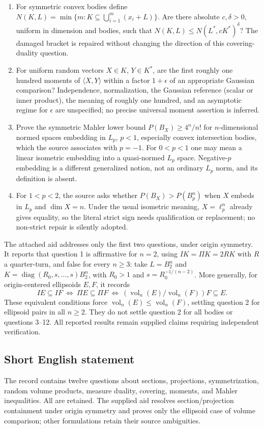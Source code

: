 \documentclass[11pt]{article}
\begin{document}
\begin{enumerate}
\item For symmetric convex bodies define $N(K,L)=\min\{m:K\subseteq\bigcup_{i=1}^m(x_i+L)\}$. Are there absolute $c,\delta>0$, uniform in dimension and bodies, such that $N(K,L)\leq N(L^*,cK^*)^\delta$? The damaged bracket is repaired without changing the direction of this covering-duality question.
\item For uniform random vectors $X\in K$, $Y\in K^*$, are the first roughly one hundred moments of $\langle X,Y\rangle$ within a factor $1+\epsilon$ of an appropriate Gaussian comparison? Independence, normalization, the Gaussian reference (scalar or inner product), the meaning of roughly one hundred, and an asymptotic regime for $\epsilon$ are unspecified; no precise universal moment assertion is inferred.
\item Prove the symmetric Mahler lower bound $P(B_X)\geq4^n/n!$ for $n$-dimensional normed spaces embedding in $L_p$, $p<1$, especially convex intersection bodies, which the source associates with $p=-1$. For $0<p<1$ one may mean a linear isometric embedding into a quasi-normed $L_p$ space. Negative-$p$ embedding is a different generalized notion, not an ordinary $L_p$ norm, and its definition is absent.
\item For $1<p<2$, the source asks whether $P(B_X)>P(B_p^n)$ when $X$ embeds in $L_p$ and $\dim X=n$. Under the usual isometric meaning, $X=\ell_p^n$ already gives equality, so the literal strict sign needs qualification or replacement; no non-strict repair is silently adopted.
\end{enumerate}

The attached aid addresses only the first two questions, under origin symmetry. It reports that question 1 is affirmative for $n=2$, using $IK=\Pi K=2RK$ with $R$ a quarter-turn, and false for every $n\geq3$: take $L=B_2^n$ and $K=\operatorname{diag}(R_0,s,\ldots,s)B_2^n$, with $R_0>1$ and $s=R_0^{-1/(n-2)}$. More generally, for origin-centered ellipsoids $E,F$, it records
\[
 IE\subseteq IF\ \Longleftrightarrow\ \Pi E\subseteq\Pi F
 \ \Longleftrightarrow\ (\operatorname{vol}_n(E)/\operatorname{vol}_n(F))F\subseteq E.
\]
These equivalent conditions force $\operatorname{vol}_n(E)\leq\operatorname{vol}_n(F)$, settling question 2 for ellipsoid pairs in all $n\geq2$. They do not settle question 2 for all bodies or questions 3--12. All reported results remain supplied claims requiring independent verification.
\subsection{Short English statement}
The record contains twelve questions about sections, projections, symmetrization, random volume products, measure duality, covering, moments, and Mahler inequalities. All are retained. The supplied aid resolves section/projection containment under origin symmetry and proves only the ellipsoid case of volume comparison; other formulations retain their source ambiguities.
\end{document}
